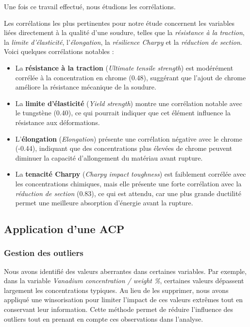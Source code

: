 \documentclass{article}
\begin{document}
Une fois ce travail effectué, nous étudions les corrélations. 

Les corrélations les plus pertinentes pour notre étude concernent les variables liées directement à la qualité d'une soudure, telles que la \textit{résistance à la traction}, la \textit{limite d'élasticité}, l'\textit{élongation}, la \textit{résilience Charpy} et la \textit{réduction de section}. Voici quelques corrélations notables :

\begin{itemize} \item La \textbf{résistance à la traction} (\textit{Ultimate tensile strength}) est modérément corrélée à la concentration en chrome (0.48), suggérant que l'ajout de chrome améliore la résistance mécanique de la soudure. \item La \textbf{limite d'élasticité} (\textit{Yield strength}) montre une corrélation notable avec le tungstène (0.40), ce qui pourrait indiquer que cet élément influence la résistance aux déformations. \item L'\textbf{élongation} (\textit{Elongation}) présente une corrélation négative avec le chrome (-0.44), indiquant que des concentrations plus élevées de chrome peuvent diminuer la capacité d'allongement du matériau avant rupture. \item La \textbf{tenacité Charpy} (\textit{Charpy impact toughness}) est faiblement corrélée avec les concentrations chimiques, mais elle présente une forte corrélation avec la \textit{réduction de section} (0.83), ce qui est attendu, car une plus grande ductilité permet une meilleure absorption d'énergie avant la rupture. \end{itemize}

\subsection{Application d'une ACP}

\subsubsection{Gestion des outliers}

Nous avons identifié des valeurs aberrantes dans certaines variables. Par exemple, dans la variable \textit{Vanadium concentration / weight \%}, certaines valeurs dépassent largement les concentrations typiques. Au lieu de les supprimer, nous avons appliqué une winsorisation pour limiter l'impact de ces valeurs extrêmes tout en conservant leur information. Cette méthode permet de réduire l'influence des outliers tout en prenant en compte ces observations dans l'analyse.\\
\end{document}
